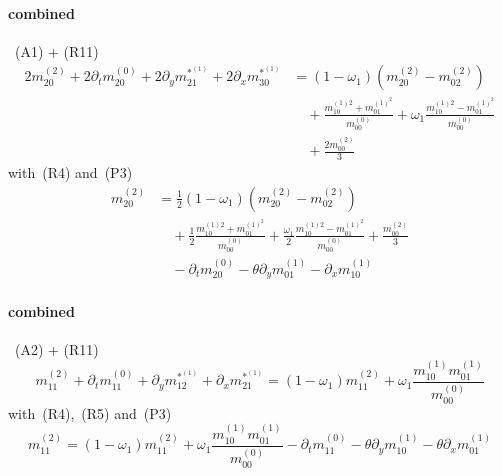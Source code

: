 \documentclass{article}
\begin{document}
  \paragraph{combined}~(A1) + (R11)
  \begin{equation*}
    \begin{aligned}
      2m_{20}^{(2)} + 2\partial_t m_{20}^{(0)} + 2\partial_y m_{21}^{*^{(1)}} + 2\partial_x m_{30}^{*^{(1)}}
      &= (1-\omega_1) \left(m_{20}^{(2)}-m_{02}^{(2)}\right)
      \\&\quad
      + \frac{ m_{10}^{(1)2} + m_{01}^{{(1)}^2}}{m_{00}^{(0)}} + \omega_1 \frac{ m_{10}^{(1)2} - m_{01}^{{(1)}^2}}{m_{00}^{(0)}}
      \\&\quad
      + \frac{2 m_{00}^{(2)}}{3}
    \end{aligned}
  \end{equation*}
  with~(R4) and~(P3)
  \begin{equation}
    \tag{C1}
    \begin{aligned}
      m_{20}^{(2)} &= \frac{1}{2}(1-\omega_1) \left(m_{20}^{(2)}-m_{02}^{(2)}\right)
      \\&\quad
      + \frac{1}{2}\frac{ m_{10}^{(1)2} + m_{01}^{{(1)}^2}}{m_{00}^{(0)}} + \frac{\omega_1}{2} \frac{ m_{10}^{(1)2} - m_{01}^{{(1)}^2}}{m_{00}^{(0)}}
      + \frac{m_{00}^{(2)}}{3}
      \\&\quad
      - \partial_t m_{20}^{(0)} - \theta\partial_y m_{01}^{(1)} - \partial_x m_{10}^{(1)}
    \end{aligned}
  \end{equation}
  \paragraph{combined}~(A2) + (R11)
  \begin{equation*}
    m_{11}^{(2)} + \partial_t m_{11}^{(0)} + \partial_y m_{12}^{*^{(1)}} + \partial_x m_{21}^{*^{(1)}} = (1-\omega_1)m_{11}^{(2)} + \omega_1 \frac{ m_{10}^{(1)}m_{01}^{(1)}}{m_{00}^{(0)}}
  \end{equation*}
  with~(R4),~(R5) and~(P3)
  \begin{equation}
    \tag{C2}
    m_{11}^{(2)} = (1-\omega_1)m_{11}^{(2)} + \omega_1 \frac{ m_{10}^{(1)}m_{01}^{(1)}}{m_{00}^{(0)}}  - \partial_t m_{11}^{(0)} - \theta\partial_y m_{10}^{(1)} - \theta\partial_x m_{01}^{(1)}
  \end{equation}
  \pagebreak
\end{document}
